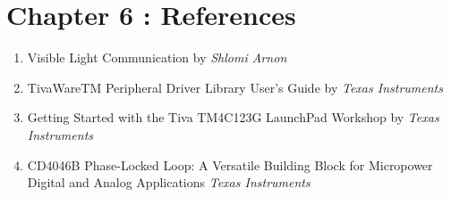 \documentclass{article}
\begin{document}
\section{Chapter 6 : References}
\begin{enumerate}
\item Visible Light Communication by \textit{Shlomi Arnon}
\item TivaWareTM Peripheral Driver Library User's Guide by \textit{Texas Instruments}
\item Getting Started with the Tiva TM4C123G LaunchPad Workshop by \textit{Texas Instruments}
\item CD4046B Phase-Locked Loop: A Versatile Building Block for Micropower Digital and Analog Applications \textit{Texas Instruments}
\end{enumerate}
\end{document}
